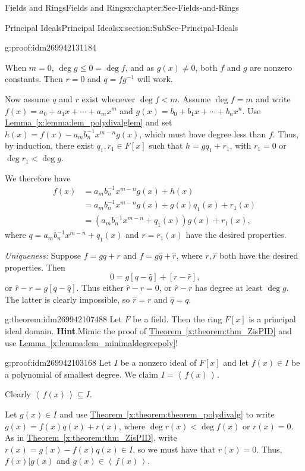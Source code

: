 \documentclass[oneside,10pt,]{book}
\numberwithin{equation}{section}
\renewcommand{\le}{\leqslant}
\newcommand{\ideal}[1]{\left\langle\, #1 \,\right\rangle}
\newcommand{\lt}{<}
\newcommand{\amp}{&}
\begin{document}
\begin{chapterptx}{Fields and Rings}{}{Fields and Rings}{}{}{x:chapter:Sec-Fields-and-Rings}
\begin{sectionptx}{Principal Ideals}{}{Principal Ideals}{}{}{x:section:SubSec-Principal-Ideals}
\begin{proofptx}{}{g:proof:idm269942131184}
\par
When \(m = 0\), \(\deg g \le 0 = \deg f\), and as \(g(x) \ne 0\), both \(f\) and \(g\) are nonzero constants. Then \(r = 0\) and \(q = fg^{-1}\) will work.%
\par
Now assume \(q\) and \(r\) exist whenever \(\deg f \lt m\). Assume \(\deg f = m\) and write \(f(x) = a_0 + a_1 x + \cdots + a_m x^m\) and \(g(x) = b_0 + b_1 x + \cdots + b_n x^n\). Use \hyperref[x:lemma:lem_polydivalglem]{Lemma~\ref{x:lemma:lem_polydivalglem}} and set \(h(x) = f(x) - a_m b_n^{-1} x^{m-n} g(x)\), which must have degree less than \(f\). Thus, by induction, there exist \(q_1, r_1\in F[x]\) such that \(h = g q_1 + r_1\), with \(r_1 = 0\) or \(\deg r_1 \lt \deg g\).%
\par
We therefore have%
\begin{align*}
f(x) \amp = a_m b_n^{-1} x^{m-n} g(x) + h(x)\\
\amp = a_m b_n^{-1} x^{m-n} g(x) + g(x) q_1(x) + r_1(x)\\
\amp = (a_m b_n^{-1} x^{m-n} + q_1(x)) g(x) + r_1(x)\text{,}
\end{align*}
where \(q = a_m b_n^{-1} x^{m-n} + q_1(x)\) and \(r = r_1(x)\) have the desired properties.%
\par
\emph{Uniqueness:} Suppose \(f = gq + r\) and \(f = g\hat{q} + \hat{r}\), where \(r,\hat{r}\) both have the desired properties. Then%
\begin{equation*}
0 = g[q - \hat{q}] + [r - \hat{r}]\text{,}
\end{equation*}
or \(\hat{r} - r = g [q - \hat{q}]\). Thus either \(\hat{r} - r = 0\), or \(\hat{r} - r\) has degree at least \(\deg g\). The latter is clearly impossible, so \(\hat{r} = r\) and \(\hat{q} = q\).%
\end{proofptx}
\begin{theorem}{}{}{g:theorem:idm269942107488}%
Let \(F\) be a field. Then the ring \(F[x]\) is a principal ideal domain.%
\textbf{Hint}.\quad{}Mimic the proof of \hyperref[x:theorem:thm_ZisPID]{Theorem~\ref{x:theorem:thm_ZisPID}} and use \hyperref[x:lemma:lem_minimaldegreepoly]{Lemma~\ref{x:lemma:lem_minimaldegreepoly}}!%
\end{theorem}
\begin{proofptx}{}{g:proof:idm269942103168}
Let \(I\) be a nonzero ideal of \(F[x]\) and let \(f(x)\in I\) be a polynomial of smallest degree. We claim \(I = \ideal{f(x)}\).%
\par
Clearly \(\ideal{f(x)}\subseteq I\).%
\par
Let \(g(x)\in I\) and use \hyperref[x:theorem:theorem_polydivalg]{Theorem~\ref{x:theorem:theorem_polydivalg}} to write \(g(x) = f(x) q(x) + r(x)\), where \(\deg r(x) \lt \deg f(x)\) or \(r(x) = 0\). As in \hyperref[x:theorem:thm_ZisPID]{Theorem~\ref{x:theorem:thm_ZisPID}}, write \(r(x) = g(x) - f(x) q(x) \in I\), so we must have that \(r(x) = 0\). Thus, \(f(x) | g(x)\) and \(g(x)\in \ideal{f(x)}\).%

\end{proofptx}
\end{sectionptx}
\end{chapterptx}
\end{document}
